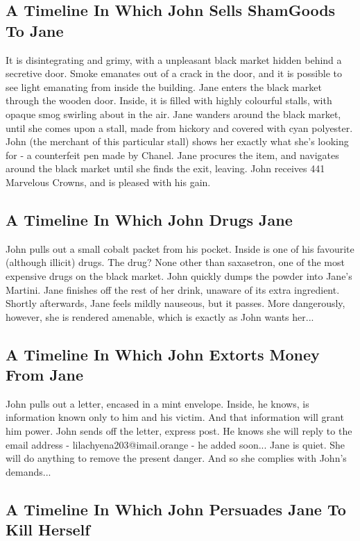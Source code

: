 \documentclass{article}
\begin{document}
\subsection{A Timeline In Which John Sells ShamGoods To Jane}


It is disintegrating and grimy, with a unpleasant black market hidden behind a secretive door.
Smoke emanates out of a crack in the door, and it is possible to see light emanating from inside the building.
Jane enters the black market through the wooden door.
Inside, it is filled with highly colourful stalls, with opaque smog swirling about in the air.
Jane wanders around the black market, until she comes upon a stall, made from hickory and covered with cyan polyester.
John (the merchant of this particular stall) shows her exactly what she's looking for {-} a counterfeit pen made by Chanel.
Jane procures the item, and navigates around the black market until she finds the exit, leaving.
John receives 441 Marvelous Crowns, and is pleased with his gain.
\subsection{A Timeline In Which John Drugs Jane}


John pulls out a small cobalt packet from his pocket. Inside is one of his favourite (although illicit) drugs.
The drug? None other than saxasetron, one of the most expensive drugs on the black market.
John quickly dumps the powder into Jane's Martini.
Jane finishes off the rest of her drink, unaware of its extra ingredient.
Shortly afterwards, Jane feels mildly nauseous, but it passes.
More dangerously, however, she is rendered amenable, which is exactly as John wants her...
\subsection{A Timeline In Which John Extorts Money From Jane}


John pulls out a letter, encased in a mint envelope. Inside, he knows, is information known only to him and his victim. And that information will grant him power.
John sends off the letter, express post. He knows she will reply to the email address {-} lilachyena203@imail.orange {-} he added soon...
Jane is quiet. She will do anything to remove the present danger. And so she complies with John's demands...
\subsection{A Timeline In Which John Persuades Jane To Kill Herself}
\end{document}

